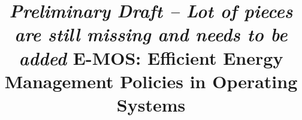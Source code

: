 \title{
\vspace{-0.15in}
\emph{Preliminary Draft -- Lot of pieces are still missing and needs to be added}
E-MOS: Efficient Energy Management Policies in Operating Systems
\vspace{-0.15in}
}

